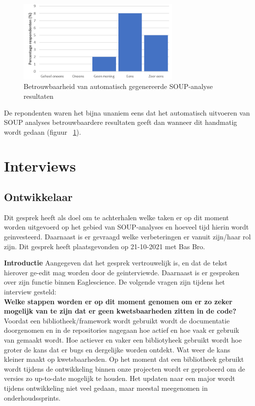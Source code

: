 \begin{figure}[bth]
    \centering
    \includegraphics[width=8cm]{gfx/appendix/Vraag5}
    \caption{Betrouwbaarheid van automatisch gegenereerde SOUP-analyse resultaten }
    \label{fig:enqueteV5}
\end{figure}

De repondenten waren het bijna unaniem eens dat het automatisch uitvoeren van SOUP analyses betrouwbaardere resultaten geeft dan wanneer dit handmatig wordt gedaan (figuur ~\ref{fig:enqueteV5}).

\clearpage
\section{Interviews}\label{sec:interviews}

\subsection{Ontwikkelaar}\label{subsec:ontwikkelaar}
Dit gesprek heeft als doel om te achterhalen welke taken er op dit moment worden uitgevoerd op het gebied van SOUP-analyses en hoeveel tijd hierin wordt geinvesteerd. Daarnaast is er gevraagd welke verbeteringen er vanuit zijn/haar rol zijn. Dit gesprek heeft plaatsgevonden op 21-10-2021 met Bas Bro.\smallskip

\textbf{Introductie }
Aangegeven dat het gesprek vertrouwelijk is, en dat de tekst hierover ge-edit mag worden door de geinterviewde.
Daarnaast is er gesproken over zijn functie binnen Eaglescience.
De volgende vragen zijn tijdens het interview gesteld:
\\
\textbf{Welke stappen worden er op dit moment genomen om er zo zeker mogelijk van te zijn dat er geen kwetsbaarheden zitten in de code? }
Voordat een bibliotheek/framework wordt gebruikt wordt de documentatie doorgenomen en in de repositories nagegaan hoe actief en hoe vaak er gebruik van gemaakt wordt. Hoe actiever en vaker een bibliotyheek gebruikt wordt hoe groter de kans dat er bugs en dergelijke worden ontdekt. Wat weer de kans kleiner maakt op kwetsbaarheden. Op het moment dat een bibliotheek gebruikt wordt tijdens de ontwikkeling binnen onze projecten wordt er geprobeerd om de versies zo up-to-date mogelijk te houden. Het updaten naar een major wordt tijdens ontwikkeling niet veel gedaan, maar meestal meegenomen in onderhoudssprints.

